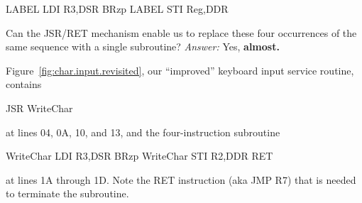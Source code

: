 \documentclass{patt}
\begin{document}
\begin{colorverbatim}
                 LABEL   LDI     R3,DSR
                         BRzp    LABEL
                         STI     Reg,DDR
\end{colorverbatim}
Can the JSR/RET mechanism enable us to replace these four occurrences
of the same sequence with a single subroutine?  {\em Answer:} Yes,
{\bf almost.}

Figure~\ref{fig:char.input.revisited}, our ``improved'' keyboard input
service routine, contains

\begin{colorverbatim}
                         JSR     WriteChar
\end{colorverbatim}
at lines 04, 0A, 10, and 13, and the four-instruction subroutine

\begin{colorverbatim}
           WriteChar     LDI     R3,DSR
                         BRzp    WriteChar
                         STI     R2,DDR
                         RET
\end{colorverbatim}
at lines 1A through 1D. Note the RET instruction (aka JMP R7)
that is needed to terminate the subroutine.
\end{document}
